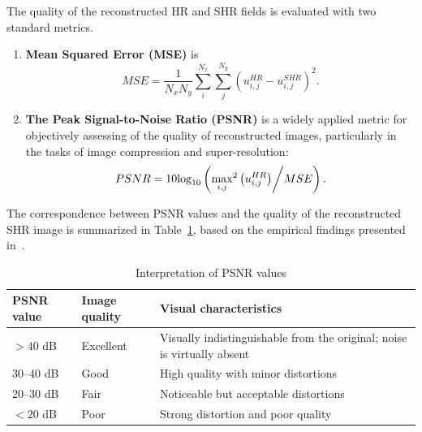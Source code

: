 \documentclass{ieeeaccess}
\begin{document}
The quality of the reconstructed HR and SHR fields is evaluated with two standard metrics.
\begin{enumerate}
    \item \textbf{Mean Squared Error (MSE)} is
    \begin{equation} \label{eq:k27f}
MSE = \frac{1}{{{N_x}{N_y}}}\sum\limits_i^{{N_x}} {\sum\limits_j^{{N_y}} {{{\left( {u_{i,j}^{HR} - u_{i,j}^{SHR}} \right)}^2}} }.
    \end{equation}
    \item \textbf{The Peak Signal-to-Noise Ratio (PSNR)} is a widely applied  metric for  objectively assessing of the quality of reconstructed images, particularly in the tasks of image compression and super-resolution:
    \begin{equation} \label{eq:k28f}
PSNR = 10{\log _{10}}\left( {{{{{\mathop {\max }\limits_{i,j} }^2}\left( {u_{i,j}^{HR}} \right)} \mathord{\left/
 {\vphantom {{{{\mathop {\max }\limits_{i,j} }^2}\left( {u_{i,j}^{HR}} \right)} {MSE}}} \right.
 \kern-\nulldelimiterspace} {MSE}}} \right).
    \end{equation}
\end{enumerate}

The correspondence between PSNR values and the quality of the reconstructed SHR image is summarized in Table~\ref{tab:k3t}, based on the empirical findings presented in~\cite{Wang}.
\begin{table}[ht]
\caption{Interpretation of PSNR values}
\setlength{\tabcolsep}{3pt}
\begin{tabular}{|p{39pt}|p{44pt}|p{145pt}|}
\hline
PSNR value & Image quality & Visual characteristics \\
\hline
$> 40$ dB & Excellent & Visually indistinguishable from the original; noise is virtually absent \\
30–40 dB & Good & High quality with minor distortions \\
20–30 dB & Fair & Noticeable but acceptable distortions \\
$< 20$ dB & Poor & Strong distortion and poor quality \\
\hline
\end{tabular}
\label{tab:k3t}
\end{table}
\end{document}
